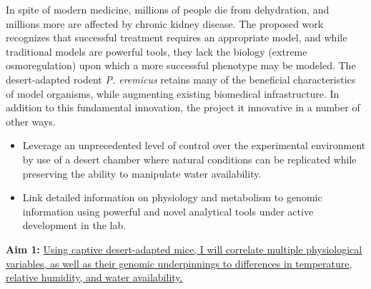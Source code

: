 \documentclass[11pt]{article}
\begin{document}
In spite of modern medicine, millions of people die from dehydration, and millions more are affected by chronic kidney disease. The proposed work recognizes that successful treatment requires an appropriate model, and while traditional models are powerful tools, they lack the biology (extreme osmoregulation) upon which a more successful phenotype may be modeled. The desert-adapted rodent \textit{P. eremicus} retains many of the beneficial characteristics of model organisms, while augmenting existing biomedical infrastructure. In addition to this fundamental innovation, the project it innovative in a number of other ways.
\begin{itemize}
\item Leverage an unprecedented level of control over the experimental environment by use of a desert chamber where natural conditions can be replicated while preserving the ability to manipulate water availability. 
\item Link detailed information on physiology and metabolism to genomic information using powerful and novel analytical tools under active development in the lab.

\end{itemize}

 

\newpage



\noindent \textbf{Aim 1:} \ul{Using captive desert-adapted mice, I will correlate multiple physiological variables, as well as their genomic underpinnings to differences in temperature, relative humidity, and water availability.} \\
\end{document}
